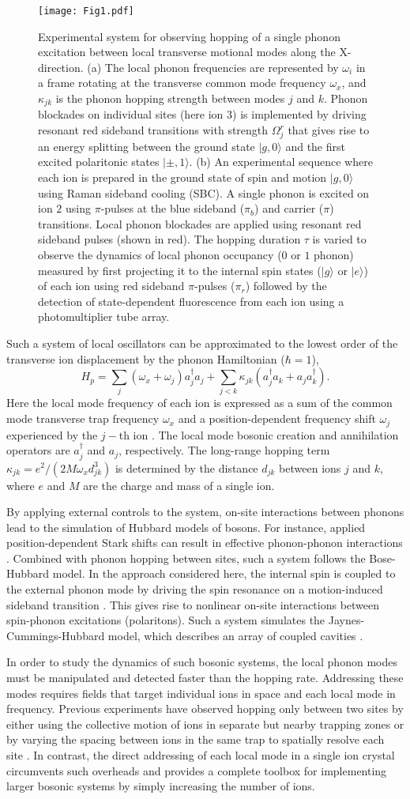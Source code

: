 \documentclass[groupaddress,9pt,twocolumn,superscriptaddress, aps, prl]{revtex4-1}
\newcommand{\ket}[1]{|#1\rangle}
\newcommand{\FigureOne}{
\begin{figure}
\begin{center}
\texttt{[image: Fig1.pdf]}
\end{center}
\renewcommand{\baselinestretch}{1}
\small\normalsize
\caption{ Experimental system for observing hopping of a single phonon excitation between local transverse motional modes along the X-direction. (a) The local phonon frequencies are represented by $\omega_i$ in a frame rotating at the transverse common mode frequency $\omega_x$, and $\kappa_{jk}$ is the phonon hopping strength between modes $j$ and $k$. Phonon blockades on individual sites (here ion 3) is implemented by driving resonant red sideband transitions with strength $\Omega^r_j$ that gives rise to an energy splitting between the ground state $\ket{g,0}$ and the first excited polaritonic states $\ket{\pm,1}$. (b) An experimental sequence where each ion is prepared in the ground state of spin and motion $\ket{g,0}$ using Raman sideband cooling (SBC). A single phonon is excited on ion $2$ using $\pi$-pulses at the blue sideband ($\pi_b$) and carrier ($\pi$) transitions. Local phonon blockades are applied using resonant red sideband pulses (shown in red). The hopping duration $\tau$  is varied to observe the dynamics of local phonon occupancy ($0$ or $1$ phonon) measured by first projecting it to the internal spin states ($\ket{g}$ or $\ket{e}$) of each ion using red sideband $\pi$-pulses ($\pi_r$) followed by the detection of state-dependent fluorescence from each ion using a photomultiplier tube array.}
\label{Fig1}
\end{figure}}
\begin{document}
\FigureOne

Such a system of local oscillators can be approximated to the lowest order of the transverse ion displacement by the phonon Hamiltonian ($\hbar=1$),
\begin{equation}
H_p = \sum_{j}(\omega_{x}+\omega_j) a_j^{\dagger}a_j +\sum_{j<k}\kappa_{jk} (a_j^{\dagger}a_k + a_j a_k^{\dagger}).
\label{Eq1}
\end{equation} 
Here the local mode frequency of each ion is expressed as a sum of the common mode transverse trap frequency $\omega_{x}$ and a position-dependent frequency shift $\omega_j$ experienced by the $j-$th ion \cite{Porras2004,Ivanov2009}. The local mode bosonic creation and annihilation operators are $a_j^{\dagger}$ and $a_j$, respectively. The long-range hopping term $\kappa_{jk} = e^2/(2M\omega_xd_{jk}^3)$ is determined by the distance $d_{jk}$ between ions $j$ and $k$, where $e$ and $M$ are the charge and mass of a single ion. 

By applying external controls to the system, on-site interactions between phonons lead to the simulation of Hubbard models of bosons. For instance, applied position-dependent Stark shifts can result in effective phonon-phonon interactions \cite{Porras2004}. Combined with phonon hopping between sites, such a system follows the Bose-Hubbard model. In the approach considered here, the internal spin is coupled to the external phonon mode by driving the spin resonance on a motion-induced sideband transition \cite{Leibfried2003}. This gives rise to nonlinear on-site interactions between spin-phonon excitations (polaritons). Such a system simulates the Jaynes-Cummings-Hubbard model, which describes an array of coupled cavities \cite{Ivanov2009, Mering2009, Greentree2006, Hartmann2006, Toyoda2013}.

In order to study the dynamics of such bosonic systems, the local phonon modes must be manipulated and detected faster than the hopping rate. Addressing these modes requires fields that target individual ions in space and each local mode in frequency. Previous experiments have observed hopping only between two sites by either using the collective motion of ions in separate but nearby trapping zones \cite{Brown2011, Harlander2011} or by varying the spacing between ions in the same trap to spatially resolve each site \cite{Haze2012}. In contrast, the direct addressing of each local mode in a single ion crystal circumvents such overheads and provides a complete toolbox for implementing larger bosonic systems by simply increasing the number of ions.
\end{document}
